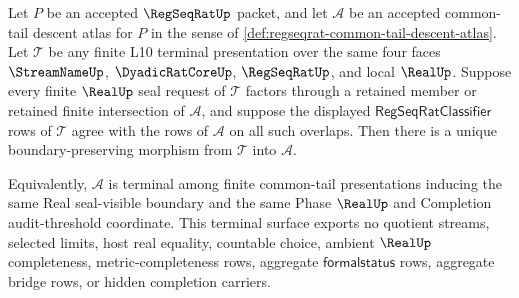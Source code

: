 \begin{theorem}
\label{thm:regseqrat-common-tail-atlas-finality}
Let $P$ be an accepted $\RegSeqRatUp$ packet, and let $\mathcal A$ be an accepted common-tail descent atlas for $P$ in the sense of \autoref{def:regseqrat-common-tail-descent-atlas}. Let $\mathcal T$ be any finite L10 terminal presentation over the same four faces $\StreamNameUp$, $\DyadicRatCoreUp$, $\RegSeqRatUp$, and local $\RealUp$. Suppose every finite $\RealUp$ seal request of $\mathcal T$ factors through a retained member or retained finite intersection of $\mathcal A$, and suppose the displayed $\mathsf{RegSeqRatClassifier}$ rows of $\mathcal T$ agree with the rows of $\mathcal A$ on all such overlaps. Then there is a unique boundary-preserving morphism from $\mathcal T$ into $\mathcal A$.

Equivalently, $\mathcal A$ is terminal among finite common-tail presentations inducing the same Real seal-visible boundary and the same Phase $\RealUp$ and Completion audit-threshold coordinate. This terminal surface exports no quotient streams, selected limits, host real equality, countable choice, ambient $\RealUp$ completeness, metric-completeness rows, aggregate $\mathsf{formalstatus}$ rows, aggregate bridge rows, or hidden completion carriers.
\end{theorem}
